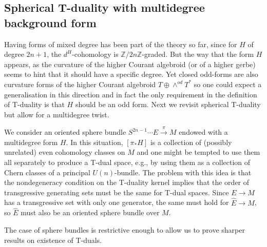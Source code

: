 \documentclass[12pt,twoside]{article}
\theoremstyle{plain}
\theoremstyle{definition}
\newcommand{\Z}{\text{$\mathbb Z$}}
\numberwithin{equation}{section}
\begin{document}
\subsection{Spherical T-duality with multidegree background form}

Having forms of mixed degree has been part of the theory so far, since for $H$ of degree $2n+1$, the $d^H$-cohomology is $\Z/2n\Z$-graded. But the way that the form $H$ appears, as the curvature of the higher Courant algebroid (or of a higher gerbe) seems to hint that it should have a specific degree. Yet closed odd-forms are also curvature forms of the higher Courant algebroid $T \oplus \wedge^{od}T^*$ so one could expect a generalisation in this direction and in fact the only requirement in the definition of T-duality is that $H$ should be an odd form. Next we revisit spherical T-duality but allow for a multidegree twist. 

We consider an oriented sphere bundle $S^{2n-1}\cdots E \stackrel{\pi}{\longrightarrow} M$ endowed with a multidegree form $H$. In this situation, $[\pi_*H]$ is a collection of (possibly unrelated) even cohomology classes on $M$ and one might be tempted to use them all separately to produce a T-dual space, e.g., by using them as a collection of Chern classes of a principal $U(n)$-bundle. The problem with this idea is that the nondegeneracy condition on the T-duality kernel implies that the order of transgressive generating sets must be the same for T-dual spaces. Since $E\to M$ has a transgressive set with only one generator, the same must hold for $\hat{E}\to M$, so $\hat{E}$ must also be an oriented sphere bundle over $M$. 

The case of sphere bundles is restrictive enough to allow us to prove sharper results on existence of T-duals.
\end{document}

